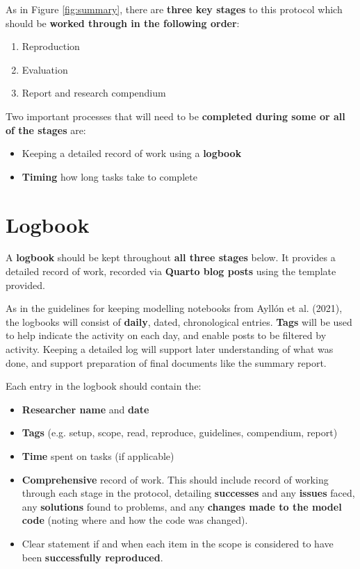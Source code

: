 As in Figure \ref{fig:summary}, there are \textbf{three key stages} to this protocol which should be \textbf{worked through in the following order}:
\begin{enumerate}
    \item Reproduction
    \item Evaluation
    \item Report and research compendium
\end{enumerate}

Two important processes that will need to be \textbf{completed during some or all of the stages} are:
\begin{itemize}
    \item Keeping a detailed record of work using a \textbf{logbook}
    \item \textbf{Timing} how long tasks take to complete
\end{itemize}

\vspace{1cm}
\section{Logbook}

A \textbf{logbook} should be kept throughout \textbf{all three stages} below. It provides a detailed record of work, recorded via \textbf{Quarto blog posts} using the template provided.

As in the guidelines for keeping modelling notebooks from Ayllón et al. (2021),\autocite{ayllon_keeping_2021} the logbooks will consist of \textbf{daily}, dated, chronological entries. \textbf{Tags} will be used to help indicate the activity on each day, and enable posts to be filtered by activity.\autocite{ayllon_keeping_2021} Keeping a detailed log will support later understanding of what was done, and support preparation of final documents like the summary report.

Each entry in the logbook should contain the:
\begin{itemize}
    \item \textbf{Researcher name} and \textbf{date}
    \item \textbf{Tags} (e.g. setup, scope, read, reproduce, guidelines, compendium, report)
    \item \textbf{Time} spent on tasks (if applicable)
    \item \textbf{Comprehensive} record of work. This should include record of working through each stage in the protocol, detailing \textbf{successes} and any \textbf{issues} faced, any \textbf{solutions} found to problems, and any \textbf{changes made to the model code} (noting where and how the code was changed).
    \item Clear statement if and when each item in the scope is considered to have been \textbf{successfully reproduced}.
\end{itemize}

